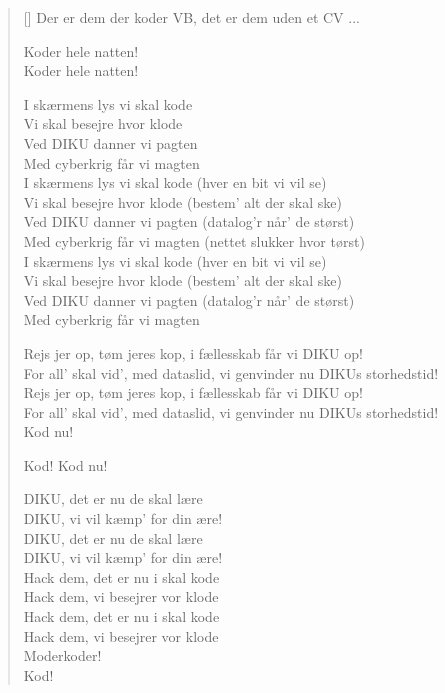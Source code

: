 \begin{multicols}{2}
\begin{verse}[\versewidth]
Der er dem der koder VB, det er dem uden et CV ...

Koder hele natten!\\
Koder hele natten!

I skærmens lys vi skal kode\\
Vi skal besejre hvor klode\\
Ved DIKU danner vi pagten\\
Med cyberkrig får vi magten\\
I skærmens lys vi skal kode (hver en bit vi vil se)\\
Vi skal besejre hvor klode (bestem' alt der skal ske)\\
Ved DIKU danner vi pagten (datalog'r når' de størst)\\
Med cyberkrig får vi magten (nettet slukker hvor tørst)\\
I skærmens lys vi skal kode (hver en bit vi vil se)\\
Vi skal besejre hvor klode (bestem' alt der skal ske)\\
Ved DIKU danner vi pagten (datalog'r når' de størst)\\
Med cyberkrig får vi magten

Rejs jer op, tøm jeres kop, i fællesskab får vi DIKU op!\\
For all' skal vid', med dataslid, vi genvinder nu DIKUs storhedstid!\\
Rejs jer op, tøm jeres kop, i fællesskab får vi DIKU op!\\
For all' skal vid', med dataslid, vi genvinder nu DIKUs storhedstid!\\
Kod nu!

Kod! Kod nu!

DIKU, det er nu de skal lære\\
DIKU, vi vil kæmp' for din ære!\\
DIKU, det er nu de skal lære\\
DIKU, vi vil kæmp' for din ære!\\
Hack dem, det er nu i skal kode\\
Hack dem, vi besejrer vor klode\\
Hack dem, det er nu i skal kode\\
Hack dem, vi besejrer vor klode\\
Moderkoder!\\
Kod!
\end{verse}
\end{multicols}
\newpage



